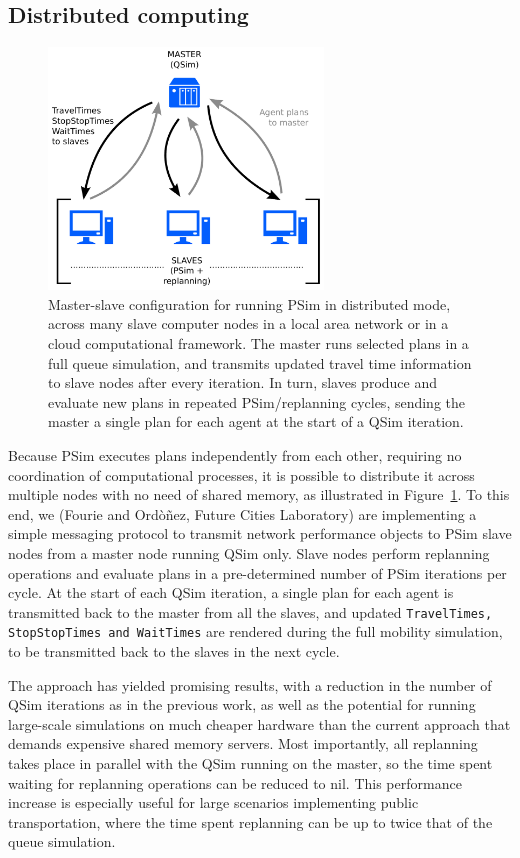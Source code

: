 \subsection{Distributed computing}
\begin{figure}
\label{fig:distributedPSim}
\begin{center} \includegraphics[width=0.65\textwidth, angle=0]{extending/figures/PSim/distributed} \end{center}
\caption{Master-slave configuration for running PSim in distributed mode, across many slave computer nodes in a local area network or in a cloud computational framework. The master runs selected plans in a full queue simulation, and transmits updated travel time information to slave nodes after every iteration. In turn, slaves produce and evaluate new plans in repeated PSim/replanning cycles, sending the master a single plan for each agent at the start of a QSim iteration.}
\end{figure}
Because PSim executes plans independently from each other, requiring no coordination of computational processes, it is possible to distribute it across multiple nodes with no need of shared memory, as illustrated in Figure~\ref{fig:distributedPSim}. To this end,  we (Fourie and Ord\`o\~nez, Future Cities Laboratory) are implementing a simple messaging protocol to transmit network performance objects to PSim slave nodes from a master node running QSim only. Slave nodes perform replanning operations and evaluate plans in a pre-determined number of PSim iterations per cycle. At the start of each QSim iteration, a single plan for each agent is transmitted back to the master from all the slaves, and updated \texttt{TravelTimes, StopStopTimes and WaitTimes} are rendered during the full mobility simulation, to be transmitted back to the slaves in the next cycle.

The approach has yielded promising results, with a reduction in the number of QSim iterations as in the previous work, as well as the potential for running large-scale simulations on much cheaper hardware than the current approach that demands expensive shared memory servers. Most importantly, all replanning takes place in parallel with the QSim running on the master, so the time spent waiting for replanning operations can be reduced to nil. This performance increase is especially useful for large scenarios implementing public transportation, where the time spent replanning can be up to twice that of the queue simulation.

